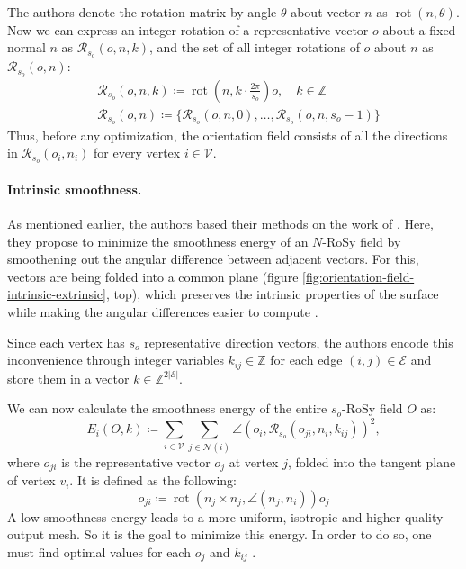 \documentclass{ACGSeminar}
\DeclareMathOperator{\rot}{rot}
\begin{document}
The authors denote the rotation matrix by angle $\theta$ about vector $n$ as $\rot(n, \theta)$. Now we can express an integer rotation of a representative vector $o$ about a fixed normal $n$ as $\mathcal{R}_{s_o}(o,n,k)$, and the set of all integer rotations of $o$ about $n$ as $\mathcal{R}_{s_o}(o,n)$:
\begin{equation*}
\begin{split}
	& \mathcal{R}_{s_o}(o,n,k) \coloneqq \rot(n, k \cdot \frac{2\pi}{s_o})o, \quad k \in \mathbb{Z} \\
	& \mathcal{R}_{s_o}(o,n) \coloneqq \{\mathcal{R}_{s_o}(o,n,0), \dots, \mathcal{R}_{s_o}(o,n,s_o-1)\}
\end{split}
\end{equation*}
Thus, before any optimization, the orientation field consists of all the directions in $\mathcal{R}_{s_o}(o_i, n_i)$ for every vertex $i \in \mathcal{V}$.

\paragraph{Intrinsic smoothness.}
As mentioned earlier, the authors based their methods on the work of \cite{ray2008n,bommes2009mixed}. Here, they propose to minimize the smoothness energy of an $N$-RoSy field by smoothening out the angular difference between adjacent vectors. For this, vectors are being folded into a common plane (figure \ref{fig:orientation-field-intrinsic-extrinsic}, top), which preserves the intrinsic properties of the surface while making the angular differences easier to compute \cite{jakob2015instant}.\bigskip

Since each vertex has $s_o$ representative direction vectors, the authors encode this inconvenience through integer variables $k_{ij} \in \mathbb{Z}$ for each edge $(i,j) \in \mathcal{E}$ and store them in a vector $k \in \mathbb{Z}^{2 \vert \mathcal{E} \vert}$.

We can now calculate the smoothness energy of the entire $s_o$-RoSy field $O$ as:
\begin{equation}\label{eq:orientation-isotropic-energy}
	E_i(O,k) \coloneqq \sum_{i \in \mathcal{V}} \sum_{j \in \mathcal{N}(i)} \angle(o_i, \mathcal{R}_{s_o}(o_{ji}, n_i, k_{ij}))^2,
\end{equation}
where $o_{ji}$ is the representative vector $o_j$ at vertex $j$, folded into the tangent plane of vertex $v_i$. It is defined as the following:
\begin{equation*}
	o_{ji} \coloneqq \rot(n_j \times n_j, \angle(n_j, n_i))o_j
\end{equation*}
A low smoothness energy leads to a more uniform, isotropic and higher quality output mesh. So it is the goal to minimize this energy. In order to do so, one must find optimal values for each $o_j$ and $k_{ij}$ \cite{jakob2015instant}.\bigskip
\end{document}
